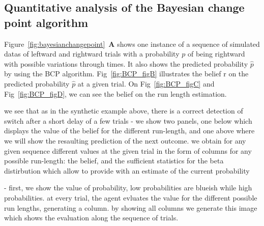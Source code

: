 \documentclass[profile,final,english, draft]{article}%
\newcommand{\seeFig}[1]{Figure~\ref{fig:#1}}
\begin{document}
\subsection{Quantitative analysis of the Bayesian change point algorithm}



%
%
%
%

\seeFig{bayesianchangepoint}~\textbf{A} shows one instance of a sequence of simulated datas of leftward and rightward trials with a probability $p$ of being rightward with possible variations through times. It also shows the predicted probability $\hat{p}$ by using the BCP algorithm. Fig~\ref{fig:BCP_figB} illustrates the belief r on the predicted probability $\hat{p}$ at a given trial. On Fig~\ref{fig:BCP_figC} and Fig~\ref{fig:BCP_figD}, we can see the belief on the run length estimation.

we see that as in the synthetic example above,
there is a correct detection of switch after a short delay of a few trials
- we show two panels, one below which displays the value of the belief for the different run-length, and one above where we will show the resaulting prediction of the next outcome.
we obtain for any given sequence different values at the given trial in the form of columns for any possible run-length: the belief,
and the sufficient statistics for the beta distirbution which allow to provide with an estimate of the current probability

- first, we show the value of probability, low probabilities are blueish while high probabilities. at every trial, the agent evluates the value for the different possible run lengths, generating a column. by showing all columns we generate this image which shows the evaluation along the sequence of trials.
\end{document}
